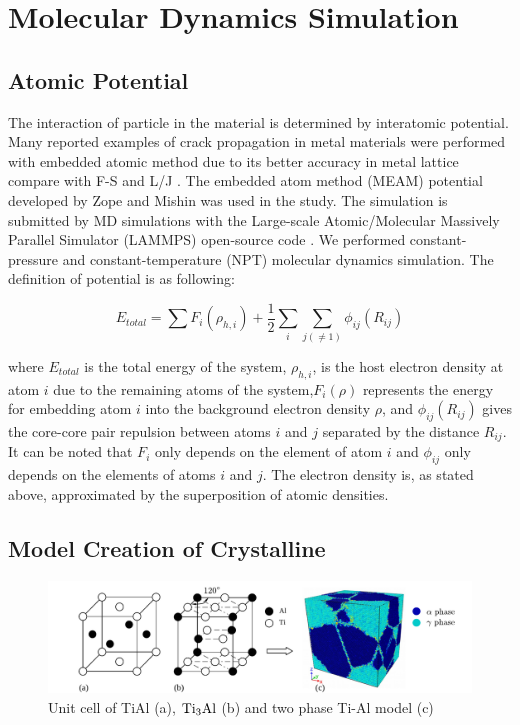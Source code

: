 \documentclass[Unknown,article,submit,moreauthors,pdftex,10pt,a4paper]{Definitions/mdpi}
\begin{document}
\section{Molecular Dynamics Simulation }\label{section:method}
\subsection{Atomic Potential}

The interaction of particle in the material is determined by interatomic potential. Many reported examples of crack propagation in metal materials were performed with embedded atomic method due to its better accuracy in metal lattice compare with F-S and L/J \cite{Ko2015}. The embedded atom method (MEAM) potential developed by Zope and Mishin \cite{Zope2003} was used in the study. The simulation is submitted by MD simulations with the Large-scale Atomic/Molecular Massively Parallel Simulator (LAMMPS) open-source code \cite{Plimpton1995}. We performed constant-pressure and constant-temperature (NPT) molecular dynamics simulation. The definition of potential is as following:
	
\begin{equation} \label{eq:eam} 
E_{total}= \displaystyle\sum F_i(\rho_{h,i})+\frac{1}{2}\sum_i\sum_{j(\neq1)}\phi_{ij}(R_{ij})
\end{equation}
	
where $E_{total}$ is the total energy of the system, $\rho_{h,i}$, is the host electron density at atom $i$ due to the remaining atoms of the system,$F_i(\rho)$ represents the energy for embedding atom $i$ into the background electron density $\rho$, and $\phi_{ij}(R_{ij})$ gives the core-core pair repulsion between atoms $i$ and $j$ separated by the distance $R_{ij}$. It can be noted that $F_i$ only depends on the element of atom $i$ and $\phi_{ij}$ only depends on the elements of atoms $i$ and $j$. The electron density is, as stated above, approximated by the superposition of atomic densities.
	
%	
\subsection{Model Creation of Crystalline}
\begin{figure}[ht]
	\centering
	\includegraphics[width=1\linewidth]{img/modeling}
	\caption{Unit cell of \rm{TiAl} (a), $\rm{Ti_3Al}$ (b) and two phase Ti-Al model (c)}
	\label{fig:tial-cell}
\end{figure}
\end{document}
